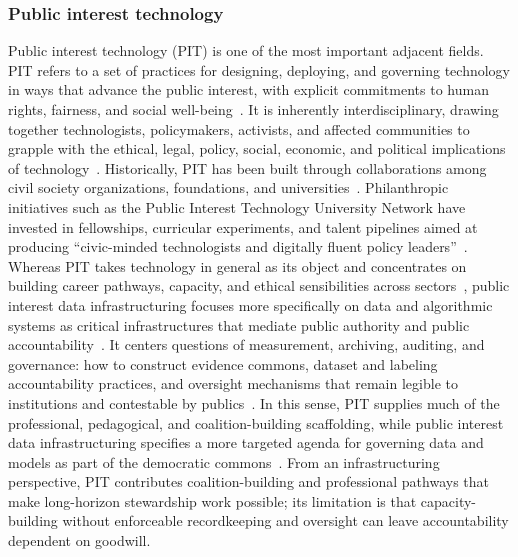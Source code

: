 \documentclass[acmsmall,screen]{acmart}
\begin{document}
\subsubsection*{Public interest technology}
Public interest technology (PIT) is one of the most important adjacent fields. PIT refers to a set of practices for designing, deploying, and governing technology in ways that advance the public interest, with explicit commitments to human rights, fairness, and social well-being~\cite{DefiningPublicInterest,abbasSocioTechnicalDesignPublic2021,washingtonDefiningPublicInterest2024}. It is inherently interdisciplinary, drawing together technologists, policymakers, activists, and affected communities to grapple with the ethical, legal, policy, social, economic, and political implications of technology~\cite{abbasCoDesigningFuturePublic2021,chowdharyCareLiberationCreating2020,stapletonWhoHasInterest2022,chambersBigTechAdvocacy2025}. Historically, PIT has been built through collaborations among civil society organizations, foundations, and universities~\cite{kramerBuildingFieldPublic,luskPublicInterestTechnology2021}. Philanthropic initiatives such as the Public Interest Technology University Network have invested in fellowships, curricular experiments, and talent pipelines aimed at producing ``civic-minded technologists and digitally fluent policy leaders''~\cite{luskPublicInterestTechnology2021,kramerBuildingFieldPublic}. Whereas PIT takes technology in general as its object and concentrates on building career pathways, capacity, and ethical sensibilities across sectors~\cite{mcguinnessPowerPublicPromise2021,knodelShapingProfessionBuilding2025}, public interest data infrastructuring focuses more specifically on data and algorithmic systems as critical infrastructures that mediate public authority and public accountability~\cite{alkhatibStreetLevelAlgorithmsTheory2019,passiTrustDataScience2018a,hutchinsonAccountabilityMachineLearning2021}. It centers questions of measurement, archiving, auditing, and governance: how to construct evidence commons, dataset and labeling accountability practices, and oversight mechanisms that remain legible to institutions and contestable by publics~\cite{mullerDesigningGroundTruth2021,paakkonenBureaucracyLensAnalyzing2020b,greenAlgorithmicRealismExpanding2020}. In this sense, PIT supplies much of the professional, pedagogical, and coalition-building scaffolding, while public interest data infrastructuring specifies a more targeted agenda for governing data and models as part of the democratic commons~\cite{stapletonWhoHasInterest2022,mcguinnessPowerPublicPromise2021,hutchinsonAccountabilityMachineLearning2021}. From an infrastructuring perspective, PIT contributes coalition-building and professional pathways that make long-horizon stewardship work possible; its limitation is that capacity-building without enforceable recordkeeping and oversight can leave accountability dependent on goodwill.
\end{document}

